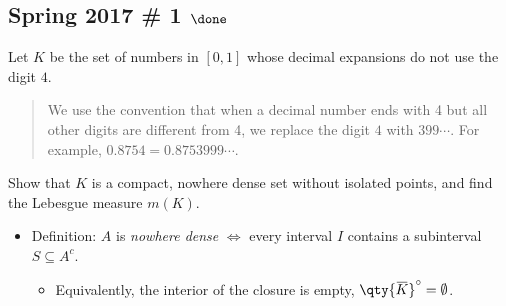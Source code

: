 \hypertarget{spring-2017-1-done}{%
\subsection{\texorpdfstring{Spring 2017 \# 1
\(\done\)}{Spring 2017 \# 1 \textbackslash done}}\label{spring-2017-1-done}}

Let \(K\) be the set of numbers in \([0, 1]\) whose decimal expansions
do not use the digit \(4\).

\begin{quote}
We use the convention that when a decimal number ends with 4 but all
other digits are different from 4, we replace the digit \(4\) with
\(399\cdots\). For example, \(0.8754 = 0.8753999\cdots\).
\end{quote}

Show that \(K\) is a compact, nowhere dense set without isolated points,
and find the Lebesgue measure \(m(K)\).

\begin{concept}

\envlist

\begin{itemize}
\tightlist
\item
  Definition: \(A\) is \emph{nowhere dense} \(\iff\) every interval
  \(I\) contains a subinterval \(S \subseteq A^c\).

  \begin{itemize}
  \tightlist
  \item
    Equivalently, the interior of the closure is empty,
    \(\qty{\mkern 1.5mu\overline{\mkern-1.5muK\mkern-1.5mu}\mkern 1.5mu}^\circ = \emptyset\).
  \end{itemize}
\end{itemize}

\end{concept}

